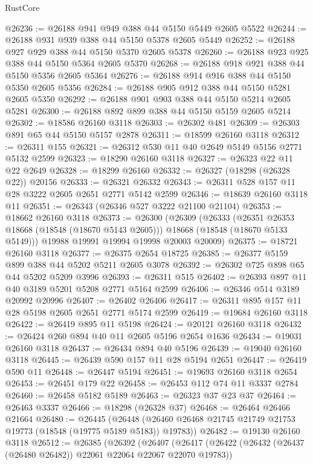 \begin{lexlean}{RustCore}
\begin{coremodule}
@26236 := @26188 @941 @949 @388 @44 @5150 @5449 @2605 @5522
@26244 := @26188 @931 @939 @388 @44 @5150 @5378 @2605 @5449
@26252 := @26188 @927 @929 @388 @44 @5150 @5370 @2605 @5378
@26260 := @26188 @923 @925 @388 @44 @5150 @5364 @2605 @5370
@26268 := @26188 @918 @921 @388 @44 @5150 @5356 @2605 @5364
@26276 := @26188 @914 @916 @388 @44 @5150 @5350 @2605 @5356
@26284 := @26188 @905 @912 @388 @44 @5150 @5281 @2605 @5350
@26292 := @26188 @901 @903 @388 @44 @5150 @5214 @2605 @5281
@26300 := @26188 @892 @899 @388 @44 @5150 @5159 @2605 @5214
@26302 := @18586 @26160 @3118
@26303 := @26302 @481
@26309 := @26303 @891 @65 @44 @5150 @5157 @2878
@26311 := @18599 @26160 @3118
@26312 := @26311 @155
@26321 := @26312 @530 @11 @40 @2649 @5149 @5156 @2771 @5132 @2599
@26323 := @18290 @26160 @3118
@26327 := @26323 @22 @11 @22 @2649
@26328 := @18299 @26160
@26332 := @26327 (@18298 (@26328 @22)) @20156
@26333 := @26321 @26332
@26343 := @26311 @528 @157 @11 @28 @3222 @2605 @2651 @2771 @5142 @2599
@26346 := @18639 @26160 @3118 @11
@26351 := @26343 (@26346 @527 @3222 @21100 @21104)
@26353 := @18662 @26160 @3118
@26373 := @26300
    (@26309
      (@26333
        (@26351 @26353 @18668 (@18548 (@18670 @5143 @2605)))
        @18668
        (@18548 (@18670 @5133 @5149)))
      @19988
      @19991
      @19994
      @19998
      @20003
      @20009)
@26375 := @18721 @26160 @3118
@26377 := @26375 @2654 @18725
@26385 := @26377 @5159 @899 @388 @44 @5202 @5211 @2605 @3078
@26392 := @26302 @725 @898 @65 @44 @5202 @5209 @3996
@26393 := @26311 @515
@26402 := @26393 @897 @11 @40 @3189 @5201 @5208 @2771 @5164 @2599
@26406 := @26346 @514 @3189 @20992 @20996
@26407 := @26402 @26406
@26417 := @26311 @895 @157 @11 @28 @5198 @2605 @2651 @2771 @5174 @2599
@26419 := @19684 @26160 @3118
@26422 := @26419 @895 @11 @5198
@26424 := @20121 @26160 @3118
@26432 := @26424 @260 @894 @40 @11 @2605 @5196 @2654 @1636
@26434 := @19031 @26160 @3118
@26437 := @26434 @894 @40 @5196
@26439 := @19040 @26160 @3118
@26445 := @26439 @590 @157 @11 @28 @5194 @2651
@26447 := @26419 @590 @11
@26448 := @26447 @5194
@26451 := @19693 @26160 @3118 @2654
@26453 := @26451 @179 @22
@26458 := @26453 @112 @74 @11 @3337 @2784
@26460 := @26458 @5182 @5189
@26463 := @26323 @37 @23 @37
@26464 := @26463 @3337
@26466 := @18298 (@26328 @37)
@26468 := @26464 @26466 @21664
@26480 := @26445
    (@26448 (@26460 @26468 @21745 @21749 @21753 @19773 (@18548 (@19775 @5189 @5183)) @19783))
@26482 := @19130 @26160 @3118
@26512 := @26385
    (@26392
      (@26407
        (@26417
          (@26422 (@26432 (@26437 (@26480 @26482)) @22061 @22064 @22067 @22070 @19783))

\end{coremodule}
\end{lexlean}
